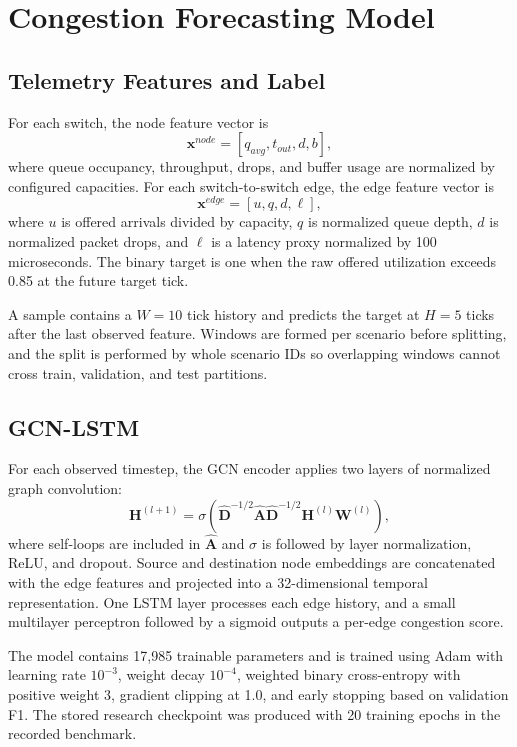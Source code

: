 \documentclass[conference]{IEEEtran}
\begin{document}
\section{Congestion Forecasting Model}
\subsection{Telemetry Features and Label}
For each switch, the node feature vector is
\begin{equation}
\mathbf{x}^{node}=[q_{avg},t_{out},d,b],
\end{equation}
where queue occupancy, throughput, drops, and buffer usage are normalized by configured capacities. For each switch-to-switch edge, the edge feature vector is
\begin{equation}
\mathbf{x}^{edge}=[u,q,d,\ell],
\end{equation}
where $u$ is offered arrivals divided by capacity, $q$ is normalized queue depth, $d$ is normalized packet drops, and $\ell$ is a latency proxy normalized by 100 microseconds. The binary target is one when the raw offered utilization exceeds 0.85 at the future target tick.

A sample contains a $W=10$ tick history and predicts the target at $H=5$ ticks after the last observed feature. Windows are formed per scenario before splitting, and the split is performed by whole scenario IDs so overlapping windows cannot cross train, validation, and test partitions.

\subsection{GCN-LSTM}
For each observed timestep, the GCN encoder applies two layers of normalized graph convolution:
\begin{equation}
\mathbf{H}^{(l+1)}=\sigma(\hat{\mathbf{D}}^{-1/2}\hat{\mathbf{A}}\hat{\mathbf{D}}^{-1/2}\mathbf{H}^{(l)}\mathbf{W}^{(l)}),
\end{equation}
where self-loops are included in $\hat{\mathbf{A}}$ and $\sigma$ is followed by layer normalization, ReLU, and dropout. Source and destination node embeddings are concatenated with the edge features and projected into a 32-dimensional temporal representation. One LSTM layer processes each edge history, and a small multilayer perceptron followed by a sigmoid outputs a per-edge congestion score.

The model contains 17,985 trainable parameters and is trained using Adam with learning rate $10^{-3}$, weight decay $10^{-4}$, weighted binary cross-entropy with positive weight 3, gradient clipping at 1.0, and early stopping based on validation F1. The stored research checkpoint was produced with 20 training epochs in the recorded benchmark.
\end{document}
